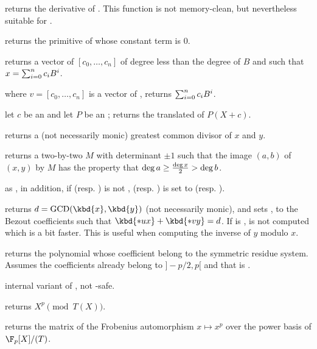  returns the derivative of .
This function is not memory-clean, but nevertheless suitable for
.

 returns the primitive of  whose
constant term is $0$.

 returns a vector of 
$[c_0,\ldots,c_n]$ of degree less than the degree of $B$ and such that
$x=\sum_{i=0}^{n}{c_i\*B^i}$.

 where $v=[c_0,\ldots,c_n]$
is a vector of , returns $\sum_{i=0}^{n}{c_i\*B^i}$.

 let $c$ be an  and let
$P$ be an ; returns the translated  of $P(X+c)$.

 returns a (not necessarily monic)
greatest common divisor of $x$  and $y$.

 returns a two-by-two 
$M$ with determinant $\pm 1$ such that the image $(a,b)$ of $(x,y)$ by $M$
has the property that $\deg a \geq {\deg x \over 2} > \deg b$.

as , in addition, if  (resp. ) is not
,  (resp. )
is set to  (resp. ).

 returns
$d = \text{GCD}(\kbd{x},\kbd{y})$ (not necessarily monic), and sets ,
 to the Bezout coefficients such that $\kbd{*ux} + \kbd{*vy} = d$.
If  is ,  is not computed which is a bit faster.
This is useful when computing the inverse of $y$ modulo $x$.

 returns the polynomial whose
coefficient belong to the symmetric residue system. Assumes the coefficients
already belong to $]-p/2, p[$ and that  is .

 internal variant of
, not -safe.

 returns $X^{p}\pmod{T(X)}$.

 returns the matrix of the
Frobenius automorphism $x\mapsto x^p$ over the power basis of $\F_p[X]/(T)$.

